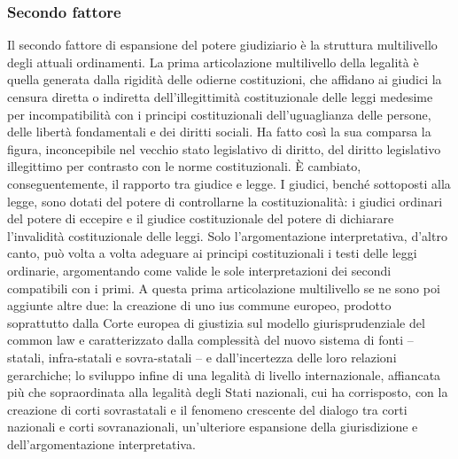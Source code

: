 \subsubsection{Secondo fattore}Il secondo fattore di espansione del potere giudiziario è la struttura multilivello degli attuali ordinamenti. La prima articolazione multilivello della legalità è quella generata dalla rigidità delle odierne costituzioni, che affidano ai giudici la censura diretta o indiretta dell’illegittimità costituzionale delle leggi medesime per incompatibilità con i principi costituzionali dell’uguaglianza delle persone, delle libertà fondamentali e dei diritti sociali. Ha fatto così la sua comparsa la figura, inconcepibile nel vecchio stato legislativo di diritto, del diritto legislativo illegittimo per contrasto con le norme costituzionali. È cambiato, conseguentemente, il rapporto tra giudice e legge. I giudici, benché sottoposti alla legge, sono dotati del potere di controllarne la costituzionalità: i giudici ordinari del potere di eccepire e il giudice costituzionale del potere di dichiarare l’invalidità costituzionale delle leggi. Solo l’argomentazione interpretativa, d’altro canto, può volta a volta adeguare ai principi costituzionali i testi delle leggi ordinarie, argomentando come valide le sole interpretazioni dei secondi compatibili con i primi. A questa prima articolazione multilivello se ne sono poi aggiunte altre due: la creazione di uno ius commune europeo, prodotto soprattutto dalla Corte europea di giustizia sul modello giurisprudenziale del common law e caratterizzato dalla complessità del nuovo sistema di fonti – statali, infra-statali e sovra-statali – e dall’incertezza delle loro relazioni gerarchiche; lo sviluppo infine di una legalità di livello internazionale, affiancata più che sopraordinata alla legalità degli Stati nazionali, cui ha corrisposto, con la creazione di corti sovrastatali e il fenomeno crescente del dialogo tra corti nazionali e corti sovranazionali, un’ulteriore espansione della giurisdizione e dell’argomentazione interpretativa.

